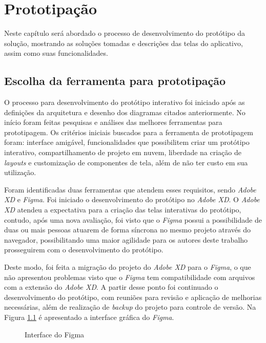 \chapter{Prototipação}

Neste capítulo será abordado o processo de desenvolvimento do protótipo da solução, mostrando as soluções tomadas e descrições das telas do aplicativo, assim como suas funcionalidades.

\section{Escolha da ferramenta para prototipação}

O processo para desenvolvimento do protótipo interativo foi iniciado após as definições da arquitetura e desenho dos diagramas citados anteriormente. No início foram feitas pesquisas e análises das melhores ferramentas para prototipagem. Os critérios iniciais buscados para a ferramenta de prototipagem foram: interface amigável, funcionalidades que possibilitem criar um protótipo interativo, compartilhamento de projeto em nuvem, liberdade na criação de \textit{layouts} e customização de componentes de tela, além de não ter custo em sua utilização.

Foram identificadas duas ferramentas que atendem esses requisitos, sendo \textit{Adobe XD} e \textit{Figma}. Foi iniciado o desenvolvimento do protótipo no \textit{Adobe XD}. O \textit{Adobe XD} atendeu a expectativa para a criação das telas interativas do protótipo, contudo, após uma nova avaliação, foi visto que o \textit{Figma} possui a possibilidade de duas ou mais pessoas atuarem de forma síncrona no mesmo projeto através do navegador, possibilitando uma maior agilidade para os autores deste trabalho prosseguirem com o desenvolvimento do protótipo.

Deste modo, foi feita a migração do projeto do \textit{Adobe XD} para o \textit{Figma}, o que não apresentou problemas visto que o \textit{Figma} tem compatibilidade com arquivos com a extensão do \textit{Adobe XD}. A partir desse ponto foi continuado o desenvolvimento do protótipo, com reuniões para revisão e aplicação de melhorias necessárias, além de realização de \textit{backup} do projeto para controle de versão. Na Figura \ref{fig:figma} é apresentado a interface gráfica do \textit{Figma}.

\begin{figure}[H]
    \centering
    \caption{Interface do Figma}
    \label{fig:figma}
\end{figure}

